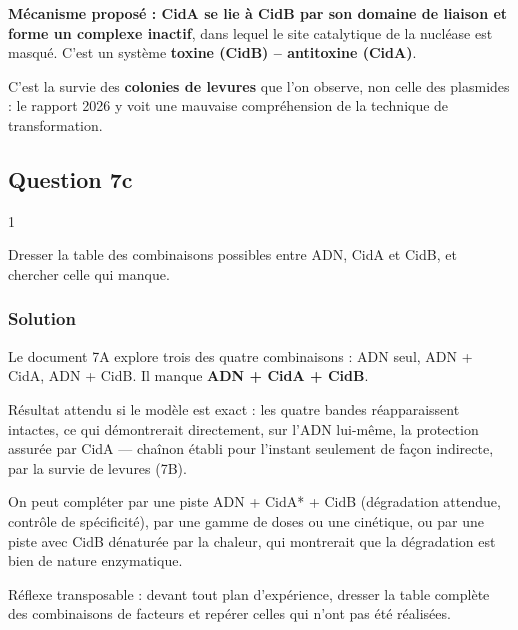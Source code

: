 \documentclass[11pt,a4paper]{article}
\begin{document}
\textbf{Mécanisme proposé : CidA se lie à CidB par son domaine de liaison et forme un complexe inactif}, dans lequel le site catalytique de la nucléase est masqué. C'est un système \textbf{toxine (CidB) -- antitoxine (CidA)}.

\begin{piege}

C'est la survie des \textbf{colonies de levures} que l'on observe, non celle des plasmides : le rapport 2026 y voit une mauvaise compréhension de la technique de transformation.

\end{piege}

\hypertarget{question-7c}{%
\subsection{Question 7c}\label{question-7c}}

\begin{indication}{1}

Dresser la table des combinaisons possibles entre ADN, CidA et CidB, et chercher celle qui manque.

\end{indication}

\hypertarget{solution-56}{%
\subsubsection{Solution}\label{solution-56}}

Le document 7A explore trois des quatre combinaisons : ADN seul, ADN + CidA, ADN + CidB. Il manque \textbf{ADN + CidA + CidB}.

Résultat attendu si le modèle est exact : les quatre bandes réapparaissent intactes, ce qui démontrerait directement, sur l'ADN lui-même, la protection assurée par CidA --- chaînon établi pour l'instant seulement de façon indirecte, par la survie de levures (7B).

On peut compléter par une piste ADN + CidA* + CidB (dégradation attendue, contrôle de spécificité), par une gamme de doses ou une cinétique, ou par une piste avec CidB dénaturée par la chaleur, qui montrerait que la dégradation est bien de nature enzymatique.

\begin{methode}

Réflexe transposable : devant tout plan d'expérience, dresser la table complète des combinaisons de facteurs et repérer celles qui n'ont pas été réalisées.

\end{methode}
\end{document}
